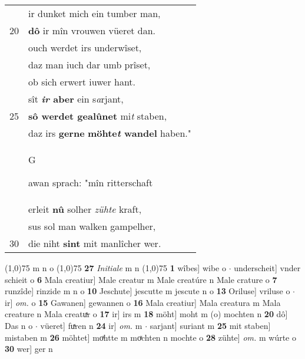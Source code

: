 \documentclass[8pt,a4paper,notitlepage]{article}
\begin{document}
\begin{table}[ht]
\begin{minipage}[t]{0.5\linewidth}
\begin{tabular}{rl}
 & ir dunket mich ein tumber man,\\ 
20 & \textbf{dô} ir mîn vrouwen vüeret dan.\\ 
 & ouch werdet irs underwîset,\\ 
 & daz man iuch dar umb prîset,\\ 
 & ob sich erwert iuwer hant.\\ 
 & sît \textbf{\textit{ir} aber} ein s\textit{a}rjant,\\ 
25 & \textbf{sô werdet gealûnet} mi\textit{t} staben,\\ 
 & daz irs \textbf{gerne} \textbf{möhte\textit{t} wandel} haben."\\ 
 & \begin{large}G\end{large}awan sprach: "mîn ritterschaft\\ 
 & erleit \textbf{nû} solher \textit{zühte} kraft,\\ 
 & sus sol man walken gampelher,\\ 
30 & die niht \textbf{sint} mit manlîcher wer.\\ 
\end{tabular}
\scriptsize
\line(1,0){75} \newline
m n o \newline
\line(1,0){75} \newline
\textbf{27} \textit{Initiale} m n  \newline
\line(1,0){75} \newline
\textbf{1} wîbes] wibe o  $\cdot$ underscheit] vnder schieit o \textbf{6} Mala creatiur] Male creatur m Male creatúre n Male crature o \textbf{7} runzîde] rinzide m n o \textbf{10} Jeschute] jescutte m jescute n o \textbf{13} Oriluse] vriluse o  $\cdot$ ir] \textit{om.} o \textbf{15} Gawanen] gewannen o \textbf{16} Mala creatiur] Mala creatura m Mala creature n Mala creatuͯr o \textbf{17} ir] irs m \textbf{18} möht] moht m (o) mochten n \textbf{20} dô] Das n o  $\cdot$ vüeret] fuͯren n \textbf{24} ir] \textit{om.} m  $\cdot$ sarjant] suriant m \textbf{25} mit staben] mistaben m \textbf{26} möhtet] moͯhtte m moͯchten n mochte o \textbf{28} zühte] \textit{om.} m wúrte o \textbf{30} wer] ger n \newline
\end{minipage}
\end{table}
\newpage
\end{document}
